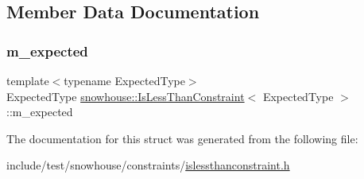 \subsection{Member Data Documentation}
\mbox{\label{structsnowhouse_1_1IsLessThanConstraint_a76819282b260cb03bef8ce82f1fc675e}} 
\subsubsection{\texorpdfstring{m\_expected}{m\_expected}}
{\footnotesize\ttfamily template$<$typename Expected\+Type$>$ \\
Expected\+Type \mbox{\hyperlink{structsnowhouse_1_1IsLessThanConstraint}{snowhouse\+::\+Is\+Less\+Than\+Constraint}}$<$ Expected\+Type $>$\+::m\+\_\+expected}



The documentation for this struct was generated from the following file\+:\begin{DoxyCompactItemize}
\item 
include/test/snowhouse/constraints/\mbox{\hyperlink{islessthanconstraint_8h}{islessthanconstraint.\+h}}\end{DoxyCompactItemize}
